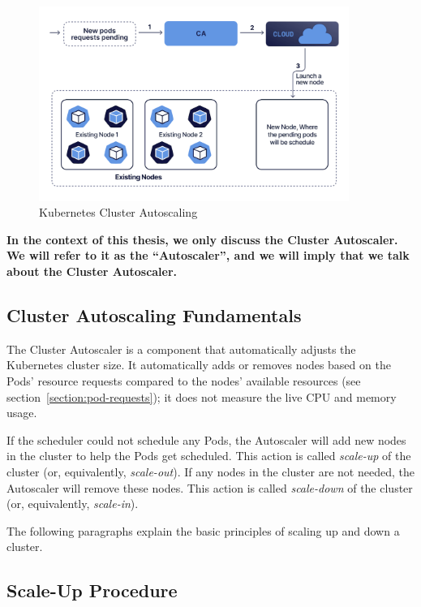 \begin{figure}[ht]
  \centering
  \includegraphics[width=0.9\textwidth]{resources/ca-process-blue.png}
  \caption{Kubernetes Cluster Autoscaling}
\end{figure}

\textbf{In the context of this thesis, we only discuss the Cluster Autoscaler. We will
refer to it as the ``Autoscaler'', and we will imply that we talk about the
Cluster Autoscaler.
}
\subsection{Cluster Autoscaling Fundamentals}

The Cluster Autoscaler is a component that automatically adjusts the Kubernetes
cluster size. It automatically adds or removes nodes based on the Pods' resource
requests compared to the nodes' available resources (see
section~\ref{section:pod-requests}); it does not measure the live CPU and memory
usage.

If the scheduler could not schedule any Pods, the Autoscaler will add new nodes
in the cluster to help the Pods get scheduled. This action is called
\textit{scale-up} of the cluster (or, equivalently, \textit{scale-out}). If any
nodes in the cluster are not needed, the Autoscaler will remove these nodes.
This action is called \textit{scale-down} of the cluster (or, equivalently,
\textit{scale-in}).

The following paragraphs explain the basic principles of scaling up and down a
cluster.

\subsection{Scale-Up Procedure}

